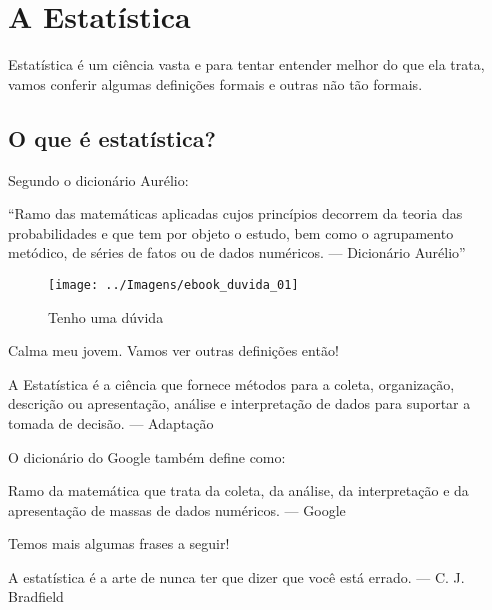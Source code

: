 \documentclass[12pt,]{style/krantz}
\renewenvironment{quote}{\begin{VF}}{\end{VF}}
\theoremstyle{definition}
\theoremstyle{definition}
\theoremstyle{definition}
\theoremstyle{remark}
\begin{document}
\mainmatter

\chapter{A Estatística}\label{a-estatistica}

Estatística é um ciência vasta e para tentar entender melhor do que ela
trata, vamos conferir algumas definições formais e outras não tão
formais.

\section{O que é estatística?}\label{o-que-e-estatistica}

Segundo o dicionário Aurélio:

\begin{quote}
``Ramo das matemáticas aplicadas cujos princípios decorrem da teoria das
probabilidades e que tem por objeto o estudo, bem como o agrupamento
metódico, de séries de fatos ou de dados numéricos. --- Dicionário
Aurélio''
\end{quote}

\begin{figure}[H]

{\centering \texttt{[image: ../Imagens/ebook\_duvida\_01]} 

}

\caption{Tenho uma dúvida}\label{fig:fig01}
\end{figure}

Calma meu jovem. Vamos ver outras definições então!

\begin{quote}
A Estatística é a ciência que fornece métodos para a coleta,
organização, descrição ou apresentação, análise e interpretação de dados
para suportar a tomada de decisão. --- Adaptação
\end{quote}

O dicionário do Google também define como:

\begin{quote}
Ramo da matemática que trata da coleta, da análise, da interpretação e
da apresentação de massas de dados numéricos. --- Google
\end{quote}

Temos mais algumas frases a seguir!

\begin{quote}
A estatística é a arte de nunca ter que dizer que você está errado. ---
C. J. Bradfield
\end{quote}
\end{document}
